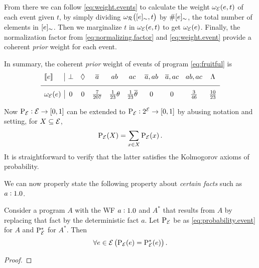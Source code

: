\documentclass[x11names]{tlp}
\begin{document}
\begin{example}
		From there we can follow \cref{eq:weight.events} to calculate the weight
		$\wgte{e, t}$ of each event given $t$, by simply dividing $\wgtc{\class{e}, t}$
		by $\#[{e}]_{\sim}$, the total number of elements in $[{e}]_{\sim}$.
		Then we marginalize $t$ in $\wgte{e, t}$ to get $\wgte{e}$.
		Finally, the normalization factor from \cref{eq:normalizing.factor} and \cref{eq:weight.event} provide a coherent \emph{prior} weight for each event.

		In summary, the coherent \emph{prior} weight of events of program
		\cref{eq:fruitful} is
		\begin{equation}
			\begin{array}{l|ccccccccc}
				\stablecore{e}          &
				\inconsistent           &
				\indepclass             &
				\co{a}                  &
				ab                      &
				ac                      &
				\co{a}, ab              &
				\co{a}, ac              &
				ab, ac                  &
				\consequenceclass
				\\ \hline
				\wgtE\at{e}              &
				0                       &
				0                       &
				\frac{7}{207}           &
				\frac{1}{23}\theta      &
				\frac{1}{23}\co{\theta} &
				0                       &
				0                       &
				\frac{3}{46}            &
				\frac{10}{23}
			\end{array}
		\end{equation}
		\label{eq:sbf.prior}

	\end{example}
\fi

Now $\prE:\EVENTSset \to \intcc{0,1}$ can be extended to
$\prE:\powerset{\EVENTSset}\to\intcc{0,1}$ by abusing notation and setting, for $X \subseteq {\mathcal{E}}$,
\begin{equation}
	\prE\at{X} = \sum_{x\in X}\prE\at{x}.
	\label{eq:prob.event.set}
\end{equation}
It is straightforward to verify that the latter satisfies the Kolmogorov axioms of probability.

We can now properly state the following property about \emph{certain facts}
such as $a:1.0$.
\begin{proposition}
	\label{prop:prob.one}

	Consider a program $A$ with the \acl{WF} $a:1.0$ and
	$A^{\ast}$ that results from $A$ by replacing that fact by the deterministic fact $a$. Let $\mathrm{P}_{{\mathcal{E}}}$ be as
	\cref{eq:probability.event} for $A$ and $\mathrm{P}^{\ast}_{{\mathcal{E}}}$ for $A^{\ast}$.
	Then
	\begin{equation}
		\forall e \in \EVENTSset \left(\prE\at{e} = \prfunc^{\ast}_{\EVENTSset}\at{e}\right).
	\end{equation}
\end{proposition}
\begin{proof}

\hfill
\end{proof}
\end{document}
